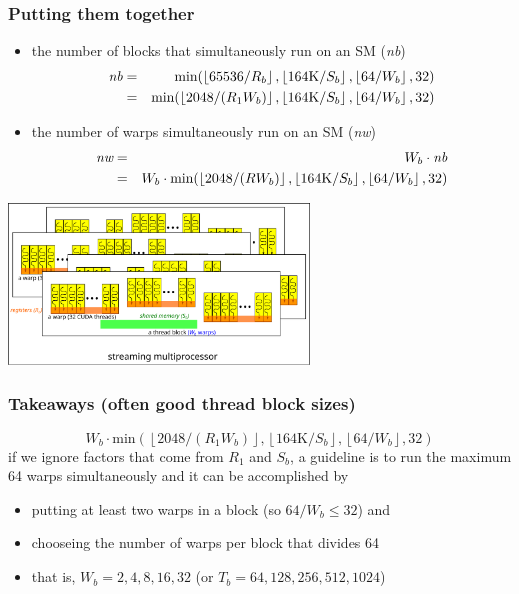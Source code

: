 \documentclass[12pt,dvipdfmx]{beamer}
\begin{document}
\begin{frame}
  \frametitle{Putting them together}
  \begin{itemize}
  \item the number of blocks that simultaneously run on an SM ({\it nb})
    \begin{eqnarray*}
      \mbox{\it nb}
      & = & \mbox{min}(\left\lfloor 65536/R_b \right\rfloor, 
            \left\lfloor 164\mbox{K}/S_b \right\rfloor,
            \left\lfloor 64/W_b \right\rfloor,
            32) \\
      & = & \mbox{min}(\left\lfloor 2048/(R_1 W_b)\right\rfloor,
            \left\lfloor 164\mbox{K}/S_b\right\rfloor,
            \left\lfloor 64/W_b \right\rfloor, 32)
    \end{eqnarray*}
    
  \item the number of warps simultaneously run on an SM ({\it nw})
    \begin{eqnarray*}
      \mbox{\it nw}
      & = & W_b \cdot \mbox{\it nb} \\
      & = & W_b \cdot \mbox{min}(\left\lfloor 2048/(R W_b)\right\rfloor,
            \left\lfloor 164\mbox{K}/S_b\right\rfloor,
            \left\lfloor 64/W_b \right\rfloor, 32)
    \end{eqnarray*}
  \end{itemize}
  \begin{center}
    \includegraphics[width=0.6\textwidth]{out/pdf/svg/warp_block_sm_5.pdf}
  \end{center}
\end{frame}

\begin{frame}
  \frametitle{Takeaways (often good thread block sizes)}
  \[ W_b \cdot \mbox{min}(\left\lfloor 2048/(R_1 W_b)\right\rfloor,
    \left\lfloor 164\mbox{K}/S_b\right\rfloor,
    \left\lfloor 64/W_b \right\rfloor, 32) \]
  if we ignore factors that come from $R_1$ and $S_b$,
  a guideline is to run the maximum 64 warps simultaneously and it can be accomplished by
  \begin{itemize}
  \item putting at least two warps in a block (so $64/W_b \leq 32$) and 
  \item chooseing the number of warps per block that divides 64
  \item that is, $W_b = 2, 4, 8, 16, 32$
    (or $T_b = 64, 128, 256, 512, 1024$)
  \end{itemize}
\end{frame}
\end{document}
